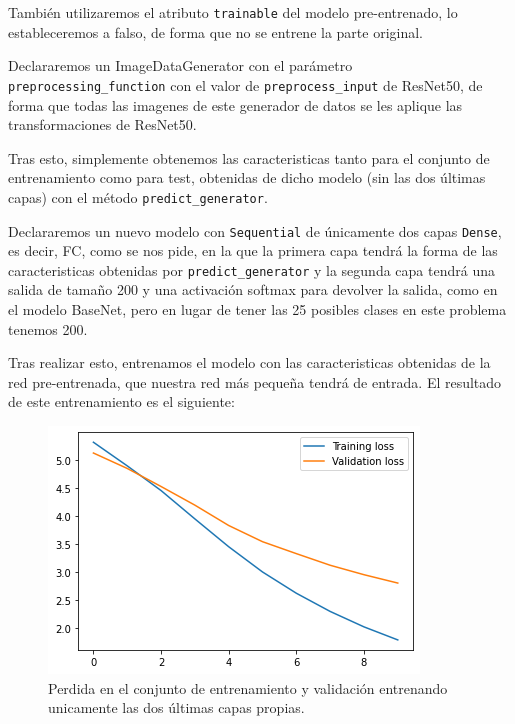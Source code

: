 \documentclass[12pt, spanish]{article}
\begin{document}
También utilizaremos el atributo \texttt{trainable} del modelo pre-entrenado, lo estableceremos a falso, de forma que no se entrene la parte original.

Declararemos un ImageDataGenerator con el parámetro \texttt{preprocessing\_function} con el valor de \texttt{preprocess\_input} de ResNet50, de forma que todas las imagenes de este generador de datos se les aplique las transformaciones de ResNet50.

Tras esto, simplemente obtenemos las caracteristicas tanto para el conjunto de entrenamiento como para test, obtenidas de dicho modelo (sin las dos últimas capas) con el método \texttt{predict\_generator}.


Declararemos un nuevo modelo con \texttt{Sequential} de únicamente dos capas \texttt{Dense}, es decir, FC, como se nos pide, en la que la primera capa tendrá la forma de las caracteristicas obtenidas por \texttt{predict\_generator} y la segunda capa tendrá una salida de tamaño 200 y una activación softmax para devolver la salida, como en el modelo BaseNet, pero en lugar de tener las 25 posibles clases en este problema tenemos 200.

Tras realizar esto, entrenamos el modelo con las caracteristicas obtenidas de la red pre-entrenada, que nuestra red más pequeña tendrá de entrada. El resultado de este entrenamiento es el siguiente:



\begin{figure}[H]
  \centering
      \includegraphics[width=\textwidth]{3-1-a-1.png}
 		\caption{Perdida en el conjunto de entrenamiento y validación entrenando unicamente las dos últimas capas propias.}
\end{figure}
\end{document}
